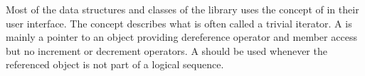 

Most of the data structures and classes of the \cgal library
uses the concept of  in their user interface.
The concept  describes what is    often called 
a trivial iterator.  
A  is
mainly   a pointer to an object providing 
dereference operator  and 
member access  but no increment or decrement 
operators.
A   should be used whenever the referenced
object
is not part of a logical sequence.
 
%
